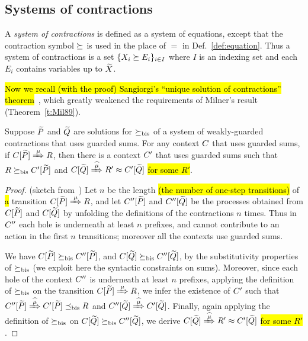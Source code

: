 \subsection{Systems of contractions}
\label{ss:SysContr}

A \emph{system of contractions} is defined as a system of equations,
except that the contraction symbol $\mathrel{\succeq}$ is used in the place of
$=$ in Def.~\ref{def:equation}. Thus a system of contractions is a set 
$\{  X_i \mathrel{\succeq} E_i\}_{i\in I}$ where $I$ is an indexing set and each
$E_i$  contains variables up to $\widetilde X$.

\hl{Now we recall (with the proof) Sangiorgi's ``unique solution of
contractions'' theorem}~\cite{sangiorgi2017equations},
which greatly weakened the requirements of Milner's result
(Theorem~\ref{t:Mil89}).

\begin{lemma}
\label{l:uptocon}
Suppose $\widetilde P$ and $\widetilde Q$ are solutions for $\mathrel{\succeq_{\rm{bis}}}$
 of a system of weakly-guarded contractions that uses 
guarded sums.
For any context $C$  that uses guarded sums,
if $\ct{\til P}\Arr{\mu}  R$, then there is a context $C'$  that uses 
guarded sums
such that $R \mathrel{\succeq_{\rm{bis}}} C' [\widetilde P]$ and $\ct{\til Q} \Arcap{\mu} R'
 \wb \ctp{\til Q}$ \hl{for some $R'$}.
\end{lemma}

\begin{proof}{(sketch from~\cite{sangiorgi2017equations})}
  Let $n$ be the length \hl{(the number of one-step transitions)} of
\hl{a} transition $\ct{\til P}\Arr\mu R$, and
let $C'' [\widetilde P]$ and $C'' [\widetilde Q]$  be the processes obtained
from  $C [\widetilde P]$ and $C [\widetilde Q]$ by unfolding the definitions
of the contractions $n$ times. Thus in $C''$ each hole is
underneath at least $n$ prefixes, and cannot contribute to an action
in the first $n$ transitions; moreover all the contexts use guarded sums.

We have $C [\widetilde P] \mathrel{\succeq_{\rm{bis}}} C'' [\widetilde P]$, and 
$C [\widetilde Q] \mathrel{\succeq_{\rm{bis}}} C'' [\widetilde Q]$, 
 by the substitutivity  properties of $\mathrel{\succeq_{\rm{bis}}}$ (we exploit here
 the syntactic constraints on sums). Moreover,
 since each hole of the  context $C''$ is underneath at least $n$
 prefixes, applying the definition
 of $ \mathrel{\succeq_{\rm{bis}}}$ on the transition 
 $\ct{\til P}\Arr{\mu}  R$, we infer the existence
 of $C'$ such that 
$\ctpp{\til P}\Arcap{\mu} \ctp{\til P} \mexpaBIS R$
and 
$\ctpp{\til Q}\Arcap{\mu}  \ctp{\til Q}$.
Finally, again applying the definition of $\mathrel{\succeq_{\rm{bis}}}$ on 
$C [\widetilde Q] \mathrel{\succeq_{\rm{bis}}} C'' [\widetilde Q]$, 
we derive 
$\ct{\til Q}\Arcap{\mu} R' \wb \ctp{\til Q}$ \hl{for some $R'$}.
\end{proof}

